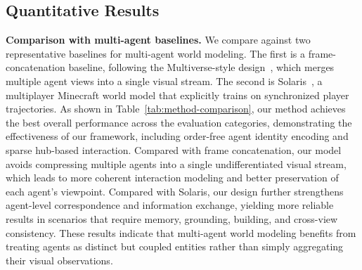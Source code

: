 \subsection{Quantitative Results}
\noindent\textbf{Comparison with multi-agent baselines.}
We compare \ours against two representative baselines for multi-agent world modeling.
The first is a frame-concatenation baseline, following the Multiverse-style design~\cite{enigma2025introducing_multiverse}, which merges multiple agent views into a single visual stream.
The second is Solaris~\cite{savva2026solaris}, a multiplayer Minecraft world model that explicitly trains on synchronized player trajectories.
As shown in Table~\ref{tab:method-comparison}, our method achieves the best overall performance across the evaluation categories, demonstrating the effectiveness of our framework, including order-free agent identity encoding and sparse hub-based interaction.
Compared with frame concatenation, our model avoids compressing multiple agents into a single undifferentiated visual stream, which leads to more coherent interaction modeling and better preservation of each agent's viewpoint.
Compared with Solaris, our design further strengthens agent-level correspondence and information exchange, yielding more reliable results in scenarios that require memory, grounding, building, and cross-view consistency.
These results indicate that multi-agent world modeling benefits from treating agents as distinct but coupled entities rather than simply aggregating their visual observations.


